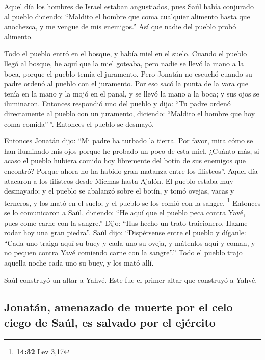  Aquel día los hombres de Israel estaban angustiados,
pues Saúl había conjurado al pueblo diciendo: ``Maldito el hombre que
coma cualquier alimento hasta que anochezca, y me vengue de mis
enemigos.'' Así que nadie del pueblo probó alimento.

 Todo el pueblo entró en el bosque, y había miel en el
suelo.  Cuando el pueblo llegó al bosque, he aquí que la
miel goteaba, pero nadie se llevó la mano a la boca, porque el pueblo
temía el juramento.  Pero Jonatán no escuchó cuando su
padre ordenó al pueblo con el juramento. Por eso sacó la punta de la
vara que tenía en la mano y la mojó en el panal, y se llevó la mano a la
boca; y sus ojos se iluminaron.  Entonces respondió uno
del pueblo y dijo: ``Tu padre ordenó directamente al pueblo con un
juramento, diciendo: ``Maldito el hombre que hoy coma comida''\,''.
Entonces el pueblo se desmayó.

 Entonces Jonatán dijo: ``Mi padre ha turbado la tierra.
Por favor, mira cómo se han iluminado mis ojos porque he probado un poco
de esta miel.  ¿Cuánto más, si acaso el pueblo hubiera
comido hoy libremente del botín de sus enemigos que encontró? Porque
ahora no ha habido gran matanza entre los filisteos''. 
Aquel día atacaron a los filisteos desde Micmas hasta Ajalón. El pueblo
estaba muy desmayado;  y el pueblo se abalanzó sobre el
botín, y tomó ovejas, vacas y terneros, y los mató en el suelo; y el
pueblo se los comió con la sangre. \footnote{\textbf{14:32} Lev 3,17}
 Entonces se lo comunicaron a Saúl, diciendo: ``He aquí
que el pueblo peca contra Yavé, pues come carne con la sangre.'' Dijo:
``Has hecho un trato traicionero. Hazme rodar hoy una gran piedra''.
 Saúl dijo: ``Dispérsense entre el pueblo y díganle:
``Cada uno traiga aquí su buey y cada uno su oveja, y mátenlos aquí y
coman, y no pequen contra Yavé comiendo carne con la sangre''.'' Todo el
pueblo trajo aquella noche cada uno su buey, y los mató allí.

 Saúl construyó un altar a Yahvé. Este fue el primer
altar que construyó a Yahvé.

\hypertarget{jonatuxe1n-amenazado-de-muerte-por-el-celo-ciego-de-sauxfal-es-salvado-por-el-ejuxe9rcito}{%
\subsection{Jonatán, amenazado de muerte por el celo ciego de Saúl, es
salvado por el
ejército}\label{jonatuxe1n-amenazado-de-muerte-por-el-celo-ciego-de-sauxfal-es-salvado-por-el-ejuxe9rcito}}

